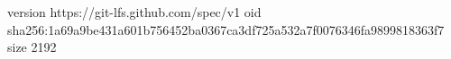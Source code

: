 version https://git-lfs.github.com/spec/v1
oid sha256:1a69a9be431a601b756452ba0367ca3df725a532a7f0076346fa9899818363f7
size 2192
